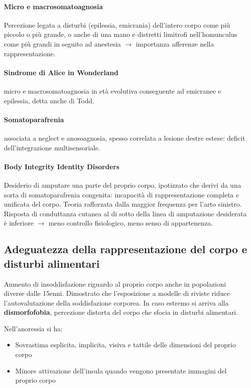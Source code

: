 \documentclass[12pt, a4paper]{article}
\begin{document}
\paragraph{Micro e macrosomatoagnosia}  Percezione legata a disturbi (epilessia, emicrania) dell'intero corpo come più piccolo o più grande, o anche di una mano e distretti limitrofi nell'homunculus come più grandi in seguito ad anestesia $\rightarrow$ importanza afferenze nella rappresentazione.

\paragraph{Sindrome di Alice in Wonderland} micro e macrosomatoagnosia in età evolutiva conseguente ad emicranee e epilessia, detta anche di Todd.

\paragraph{Somatoparafrenia}  associata a neglect e anosoagnosia, spesso correlata a lesione destre estese: deficit dell'integrazione multisensoriale.

\paragraph{Body Integrity Identity Disorders} Desiderio di amputare una parte del proprio corpo, ipotizzato che derivi da una sorta di somatoparafrenia congenita: incapacità di rappresentazione completa e unificata del corpo. Teoria rafforzata dalla maggior frequenza per l'arto sinistro.
Risposta di conduttanza cutanea al di sotto della linea di amputazione desiderata è inferiore $\rightarrow$ meno controllo fisiologico, meno senso di appartenenza.

\subsection{Adeguatezza della rappresentazione del corpo e disturbi alimentari}

Aumento di insoddisfazione riguardo al proprio corpo anche in popolazioni diverse dalle 15enni. Dimostrato che l'esposizione a modelle di riviste riduce l'autovalutazione della soddisfazione corporea.
In caso estremo si arriva alla \textbf{dismorfofobia}, percezione distorta del corpo che sfocia in disturbi alimentari.

Nell'anoressia si ha:
\begin{itemize}
    \item Sovrastima esplicita, implicita, visiva e tattile  delle dimensioni del proprio corpo
    \item Minore attivazione dell'insula quando vengono presentate immagini del proprio corpo
\end{itemize}
\end{document}
